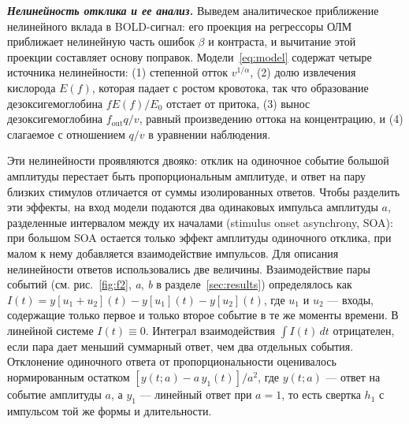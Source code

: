 \textbf{\textit{Нелинейность отклика и ее анализ.}} Выведем аналитическое приближение нелинейного вклада в BOLD-сигнал: его проекция на регрессоры ОЛМ приближает нелинейную часть ошибок $\beta$ и контраста, и вычитание этой проекции составляет основу поправок. Модели~\eqref{eq:model} содержат четыре источника нелинейности: (1) степенной отток $v^{1/\alpha}$, (2) долю извлечения кислорода $E(f)$, которая падает с ростом кровотока, так что образование дезоксигемоглобина $fE(f)/E_0$ отстает от притока, (3) вынос дезоксигемоглобина $f_{\mathrm{out}}q/v$, равный произведению оттока на концентрацию, и (4) слагаемое с отношением $q/v$ в уравнении наблюдения.

Эти нелинейности проявляются двояко: отклик на одиночное событие большой амплитуды перестает быть пропорциональным амплитуде, и ответ на пару близких стимулов отличается от суммы изолированных ответов. Чтобы разделить эти эффекты, на вход модели подаются два одинаковых импульса амплитуды $a$, разделенные интервалом между их началами (stimulus onset asynchrony, SOA): при большом SOA остается только эффект амплитуды одиночного отклика, при малом к нему добавляется взаимодействие импульсов. Для описания нелинейности ответов использовались две величины. Взаимодействие пары событий (см. рис.~\ref{fig:f2}, \textit{a}, \textit{b} в разделе~\ref{sec:results}) определялось как $I(t)=y[u_1+u_2](t)-y[u_1](t)-y[u_2](t)$, где $u_1$ и $u_2$ --- входы, содержащие только первое и только второе событие в те же моменты времени. В линейной системе $I(t)\equiv0$. Интеграл взаимодействия $\int I(t)\,dt$ отрицателен, если пара дает меньший суммарный ответ, чем два отдельных события. Отклонение одиночного ответа от пропорциональности оценивалось нормированным остатком $[y(t;a)-a\,y_1(t)]/a^2$, где $y(t;a)$ --- ответ на событие амплитуды $a$, а $y_1$ --- линейный ответ при $a=1$, то есть свертка $h_1$ с импульсом той же формы и длительности.

